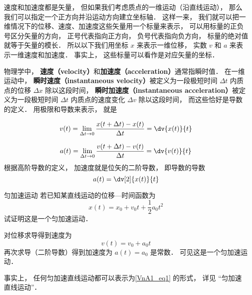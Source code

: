 

速度和加速度都是矢量， 但如果我们考虑质点的一维运动（沿直线运动）， 那么我们可以指定一个正方向并沿运动方向建立坐标轴． 这样一来， 我们就可以把一维情况下的位移、速度、加速度这些矢量用一个标量来表示， 可以用标量的正负号区分矢量的方向， 正号代表指向正方向， 负号代表指向负方向， 标量的绝对值就等于矢量的模长． 所以以下我们用坐标 $x$ 来表示一维位移， 实数 $v$ 和 $a$ 来表示一维速度和加速度． 事实上， 这些标量可以看作是对应矢量的坐标．

物理学中， \textbf{速度（velocity）}和\textbf{加速度（acceleration）}通常指瞬时值． 在一维运动中， \textbf{瞬时速度（instantaneous velocity）}被定义为一段极短时间 $\Delta t$ 内质点的位移 $\Delta x$ 除以这段时间， \textbf{瞬时加速度（instantaneous acceleration）}被定义为一段极短时间 $\Delta t$ 内质点的速度变化 $\Delta v$ 除以这段时间， 而这些恰好是导数的定义． 用极限和导数来表示， 就是

\begin{equation}
v(t) = \lim_{\Delta t\to 0} \frac{x(t+\Delta t) - x(t)}{\Delta t} = \dv{x(t)}{t}
\end{equation}

\begin{equation}
a(t) = \lim_{\Delta t\to 0} \frac{v(t+\Delta t) - v(t)}{\Delta t} = \dv{v(t)}{t}
\end{equation}
根据高阶导数的定义， 加速度就是位矢的二阶导数， 即导数的导数
\begin{equation}
a(t) = \dv[2]{x(t)}{t}
\end{equation}

\begin{example}{匀加速运动}\label{VnA1_ex1}
若已知某直线运动的位移—时间函数为
\begin{equation}\label{VnA1_eq1}
x(t) = x_0 + v_0 t + \frac{1}{2} a_0 t^2
\end{equation}
试证明这是一个匀加速运动．

对位移求导得到速度为
\begin{equation}
v(t) = v_0 + a_0 t
\end{equation}
再次求导（二阶导数）得到加速度为 $a(t) = a_0$ 是常数． 可见这是一个匀加速运动．
\end{example}
事实上， 任何匀加速直线运动都可以表示为\autoref{VnA1_eq1} 的形式， 详见 “匀加速直线运动”．

